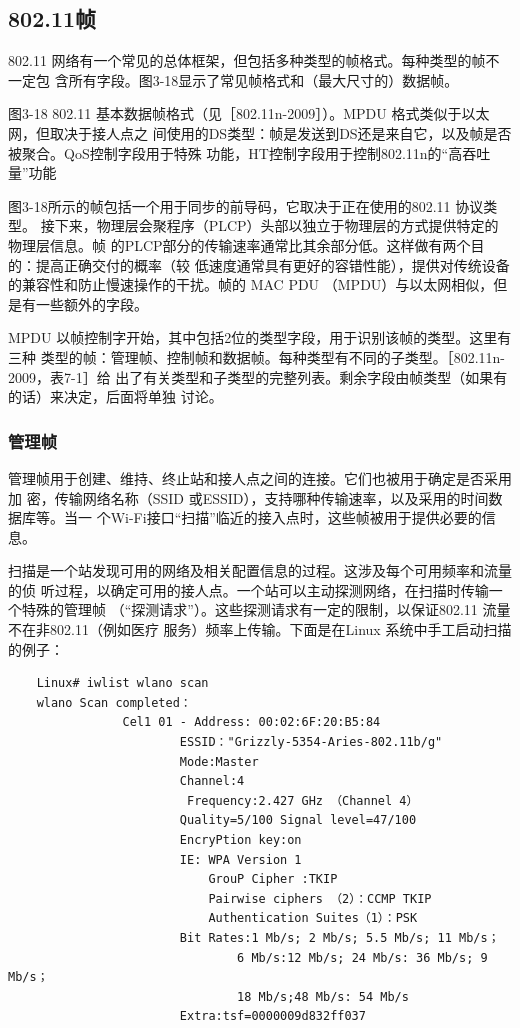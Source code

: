 \subsection{802.11帧}

802.11 网络有一个常见的总体框架，但包括多种类型的帧格式。每种类型的帧不一定包
含所有字段。图3-18显示了常见帧格式和（最大尺寸的）数据帧。

图3-18
802.11 基本数据帧格式（见［802.11n-2009］）。MPDU 格式类似于以太网，但取决于接人点之
间使用的DS类型：帧是发送到DS还是来自它，以及帧是否被聚合。QoS控制字段用于特殊
功能，HT控制字段用于控制802.11n的“高吞吐量”功能

图3-18所示的帧包括一个用于同步的前导码，它取决于正在使用的802.11 协议类型。
接下来，物理层会聚程序（PLCP）头部以独立于物理层的方式提供特定的物理层信息。帧
的PLCP部分的传输速率通常比其余部分低。这样做有两个目的：提高正确交付的概率（较
低速度通常具有更好的容错性能），提供对传统设备的兼容性和防止慢速操作的干扰。帧的
MAC PDU （MPDU）与以太网相似，但是有一些额外的字段。

MPDU 以帧控制字开始，其中包括2位的类型字段，用于识别该帧的类型。这里有三种
类型的帧：管理帧、控制帧和数据帧。每种类型有不同的子类型。［802.11n-2009，表7-1］给
出了有关类型和子类型的完整列表。剩余字段由帧类型（如果有的话）来决定，后面将单独
讨论。

\subsubsection{管理帧}

管理帧用于创建、维持、终止站和接人点之间的连接。它们也被用于确定是否采用加
密，传输网络名称（SSID 或ESSID），支持哪种传输速率，以及采用的时间数据库等。当一
个Wi-Fi接口“扫描”临近的接入点时，这些帧被用于提供必要的信息。

扫描是一个站发现可用的网络及相关配置信息的过程。这涉及每个可用频率和流量的侦
听过程，以确定可用的接人点。一个站可以主动探测网络，在扫描时传输一个特殊的管理帧
（“探测请求”）。这些探测请求有一定的限制，以保证802.11 流量不在非802.11（例如医疗
服务）频率上传输。下面是在Linux 系统中手工启动扫描的例子：

\begin{verbatim}
    Linux# iwlist wlano scan
    wlano Scan completed：
                Cel1 01 - Address: 00:02:6F:20:B5:84
                        ESSID："Grizzly-5354-Aries-802.11b/g"
                        Mode:Master
                        Channel:4
                         Frequency:2.427 GHz （Channel 4）
                        Quality=5/100 Signal level=47/100
                        EncryPtion key:on
                        IE: WPA Version 1
                            GrouP Cipher :TKIP
                            Pairwise ciphers （2）：CCMP TKIP
                            Authentication Suites（1）：PSK
                        Bit Rates:1 Mb/s; 2 Mb/s; 5.5 Mb/s; 11 Mb/s；
                                6 Mb/s:12 Mb/s; 24 Mb/s: 36 Mb/s; 9 Mb/s；
                                18 Mb/s;48 Mb/s: 54 Mb/s
                        Extra:tsf=0000009d832ff037
\end{verbatim}

